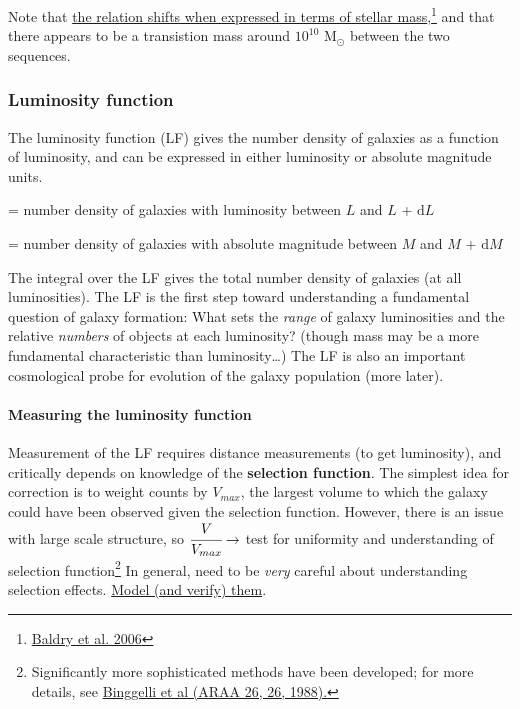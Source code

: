 \documentclass{article}
\begin{document}
Note that
\href{http://astronomy.nmsu.edu/holtz/a555/images/mnr_11081_f7.htm}
{the relation shifts when expressed in terms of stellar mass},\footnote{
    \href{http://adsabs.harvard.edu/abs/2006MNRAS.373..469B}
    {Baldry et al. 2006}
}
and that there appears to be a transistion
mass around $10^{10}$ M$_{\odot}$ between the two sequences.

\subsubsection{Luminosity function}
The luminosity function (LF) gives the number density of galaxies as a
function of luminosity, and can be expressed in either luminosity or
absolute magnitude units.
\begin{description}[labelwidth=3em, labelindent=0.25in]
    \item [$\Phi(L)$] = number density of galaxies with
        luminosity between $L$ and $L$ + $\mathrm{d}L$
    \item [$\Phi(M)$] = number density of galaxies with absolute
        magnitude between $M$ and $M$ + $\mathrm{d}M$
\end{description}
The integral over the LF gives the total number density of galaxies (at all
luminosities). The LF is the first step toward understanding a fundamental
question of galaxy formation: What sets the \emph{range} of galaxy luminosities
and the relative \emph{numbers} of objects at each luminosity? (though mass may
be a more fundamental characteristic than luminosity\ldots) The LF is also an
important cosmological probe for evolution of the galaxy population (more
later).

\paragraph{Measuring the luminosity function}
Measurement of the LF requires distance measurements (to get luminosity),
and critically depends on knowledge of the \textbf{selection
function}.
The simplest idea for correction is to weight counts by $V_{max}$, the largest
volume to which the galaxy could have been observed given the selection
function. However, there is an issue with large scale structure, so
$\cfrac{V}{V_{max}} \rightarrow$ test for uniformity and understanding
of selection function\footnote{
    Significantly more sophisticated methods have been developed; for more details, see
    \href{http://adsabs.harvard.edu/cgi-bin/nph-bib_query?bibcode=1988ARA\%26A..26..509}
    {Binggelli et al (ARAA 26, 26, 1988).}
}
In general, need to be \emph{very} careful about
understanding selection effects.
\href{http://astronomy.nmsu.edu/holtz/a555/resources/lf_selection.gif}
{Model (and verify) them}.
\end{document}

